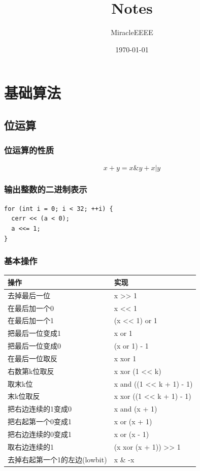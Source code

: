 \documentclass[11pt]{article}
\author{MiracleEEEE}
\date{\today}
\title{Notes}
\begin{document}
\maketitle
\tableofcontents


\section{基础算法}
\label{sec-1}

\subsection{位运算}
\label{sec-1-1}

\subsubsection{位运算的性质}
\label{sec-1-1-1}

$$x+y=x \& y + x | y$$ 

\subsubsection{输出整数的二进制表示}
\label{sec-1-1-2}

\begin{verbatim}
for (int i = 0; i < 32; ++i) {
  cerr << (a < 0);
  a <<= 1;
}
\end{verbatim}

\subsubsection{基本操作}
\label{sec-1-1-3}

\begin{center}
\begin{tabular}{ll}
操作 & 实现\\
\hline
去掉最后一位 & x >> 1\\
在最后加一个0 & x << 1\\
在最后加一个1 & (x << 1) or 1\\
把最后一位变成1 & x or 1\\
把最后一位变成0 & (x or 1) - 1\\
在最后一位取反 & x xor 1\\
右数第k位取反 & x xor (1 << k)\\
取末k位 & x and ((1 << k + 1) - 1)\\
末k位取反 & x xor ((1 << k + 1) - 1)\\
把右边连续的1变成0 & x and (x + 1)\\
把右起第一个0变成1 & x or (x + 1)\\
把右边连续的0变成1 & x or (x - 1)\\
取右边连续的1 & (x xor (x + 1)) >> 1\\
去掉右起第一个1的左边(lowbit) & x \& -x\\
\end{tabular}
\end{center}
\end{document}
